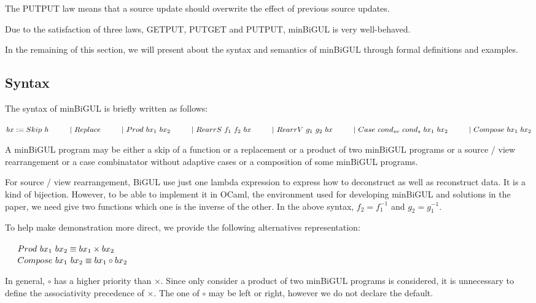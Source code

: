 \documentclass[runningheads]{llncs}
\newcommand{\tab}{\hspace*{5mm}}
\newcommand{\qtab}{\hspace*{5mm} \ \quad}
\begin{document}
The PUTPUT law means that a source update should overwrite the effect of previous source updates.

Due to the satisfaction of three laws, GETPUT, PUTGET and PUTPUT, minBiGUL is very well-behaved.

In the remaining of this section, we will present about the syntax and semantics of minBiGUL through formal definitions and examples.

\subsection{Syntax}

The syntax of minBiGUL is briefly written as follows:

$bx := Skip \ h \\ 
    \qtab | \ Replace \\ 
    \qtab | \ Prod \ bx_1 \ bx_2 \\ 
    \qtab | \ RearrS \ f_1 \ f_2 \ bx \\
    \qtab | \ RearrV \ g_1 \ g_2 \ bx \\
    \qtab | \ Case \ cond_{sv} \ cond_{s} \ bx_1 \ bx_2 \\ 
    \qtab | \ Compose \ bx_1 \ bx_2$

A minBiGUL program may be either a skip of a function or a replacement or a product of two minBiGUL programs or a source / view rearrangement or a case combinatator without adaptive cases or a composition of some minBiGUL programs.

For source / view rearrangement, BiGUL use just one lambda expression to express how to deconstruct as well as reconstruct data. It is a kind of bijection. However, to be able to implement it in OCaml, the environment used for developing minBiGUL and solutions in the paper, we need give two functions which one is the inverse of the other. In the above syntax, $f_2 = f_1^{-1}$ and $g_2 = g_1^{-1}$.

To help make demonstration more direct, we provide the following alternatives representation:

    $\tab Prod \ bx_1 \ bx_2 \equiv bx_1 \times bx_2$\\
    $\tab Compose \ bx_1 \ bx_2 \equiv bx_1 \circ bx_2$

In general, $\circ$ has a higher priority than $\times$. Since only consider a product of two minBiGUL programs is considered, it is unnecessary to define the associativity precedence of $\times$. The one of $\circ$ may be left or right, however we do not declare the default.
\end{document}

